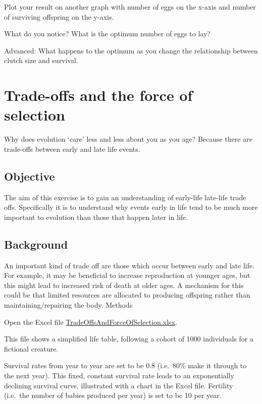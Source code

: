 \documentclass[
  a4paper]{book}
\begin{document}
Plot your result on another graph with number of eggs on the x-axis and
number of surviving offspring on the y-axis.

What do you notice? What is the optimum number of eggs to lay?

Advanced: What happens to the optimum as you change the relationship
between clutch size and survival.

\hypertarget{trade-offs-and-the-force-of-selection}{%
\chapter{Trade-offs and the force of
selection}\label{trade-offs-and-the-force-of-selection}}

Why does evolution `care' less and less about you as you age? Because
there are trade-offs between early and late life events.

\hypertarget{objective-1}{%
\section{Objective}\label{objective-1}}

The aim of this exercise is to gain an understanding of early-life
late-life trade offs. Specifically it is to understand why events early
in life tend to be much more important to evolution than those that
happen later in life.

\hypertarget{background-2}{%
\section{Background}\label{background-2}}

An important kind of trade off are those which occur between early and
late life. For example, it may be beneficial to increase reproduction at
younger ages, but this might lead to increased risk of death at older
ages. A mechanism for this could be that limited resources are allocated
to producing offspring rather than maintaining/repairing the body.
Methods

Open the Excel file
\href{https://www.dropbox.com/s/7eyoencvqc3hwv7/TradeOffsAndForceOfSelection.xlsx?dl=1}{TradeOffsAndForceOfSelection.xlsx}.

This file shows a simplified life table, following a cohort of 1000
individuals for a fictional creature.

Survival rates from year to year are set to be 0.8 (i.e.~80\% make it
through to the next year). This fixed, constant survival rate leads to
an exponentially declining survival curve, illustrated with a chart in
the Excel file. Fertility (i.e.~the number of babies produced per year)
is set to be 10 per year.
\end{document}

